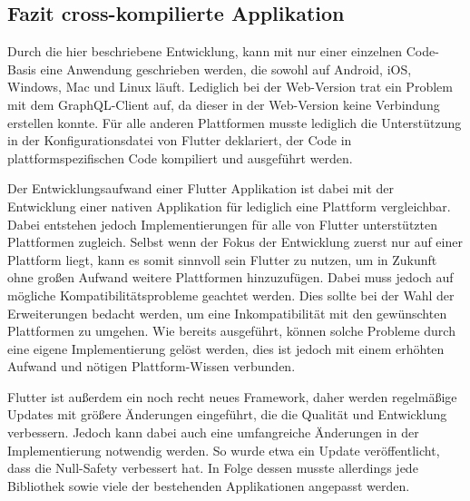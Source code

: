\subsection{Fazit cross-kompilierte Applikation}
Durch die hier beschriebene Entwicklung, kann mit nur einer einzelnen Code-Basis eine Anwendung geschrieben werden, die sowohl auf Android, iOS, Windows, Mac und Linux läuft. Lediglich bei der Web-Version trat ein Problem mit dem GraphQL-Client auf, da dieser in der Web-Version keine Verbindung erstellen konnte. Für alle anderen Plattformen musste lediglich die Unterstützung in der Konfigurationsdatei von Flutter deklariert, der Code in plattformspezifischen Code kompiliert und ausgeführt werden.

Der Entwicklungsaufwand einer Flutter Applikation ist dabei mit der Entwicklung einer nativen Applikation für lediglich eine Plattform vergleichbar. Dabei entstehen jedoch Implementierungen für alle von Flutter unterstützten Plattformen zugleich. Selbst wenn der Fokus der Entwicklung zuerst nur auf einer Plattform liegt, kann es somit sinnvoll sein Flutter zu nutzen, um in Zukunft ohne großen Aufwand weitere Plattformen hinzuzufügen.
Dabei muss jedoch auf mögliche Kompatibilitätsprobleme geachtet werden.
Dies sollte bei der Wahl der Erweiterungen bedacht werden, um eine Inkompatibilität mit den gewünschten Plattformen zu umgehen. 
Wie bereits ausgeführt, können solche Probleme durch eine eigene Implementierung gelöst werden, dies ist jedoch mit einem erhöhten Aufwand und nötigen Plattform-Wissen verbunden.

Flutter ist außerdem ein noch recht neues Framework, daher werden regelmäßige Updates mit größere Änderungen eingeführt, die die Qualität und Entwicklung verbessern. Jedoch kann dabei auch eine umfangreiche Änderungen in der Implementierung notwendig werden. So wurde etwa ein Update veröffentlicht, dass die Null-Safety verbessert hat. In Folge dessen musste allerdings jede Bibliothek sowie viele der bestehenden Applikationen angepasst werden.